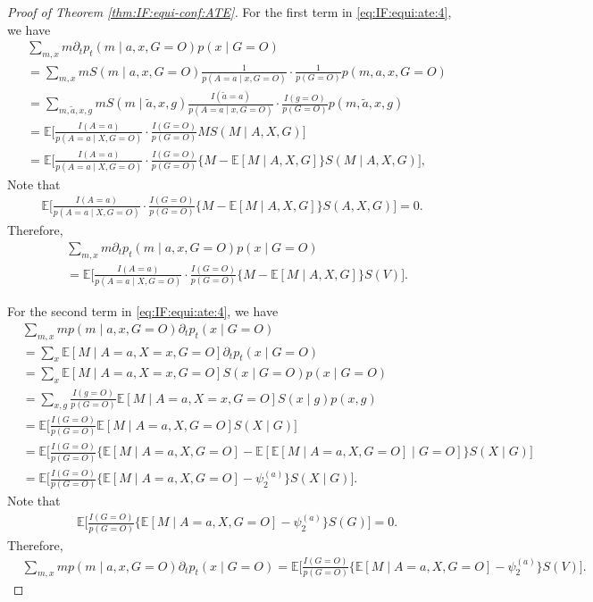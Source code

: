 \documentclass[10pt]{article}
\newcommand{\E}{\mathbb{E}}
\begin{document}
\begin{proof}[Proof of Theorem \ref{thm:IF:equi-conf:ATE}]
For the first term in \eqref{eq:IF:equi:ate:4}, we have
\begin{align*}
&\sum_{m,x} m\partial_t p_t(m\mid a,x,G=O)p(x\mid G=O)\\
&=\sum_{m,x} mS(m\mid a,x,G=O)\frac{1}{p(A=a\mid x,G=O)}\cdot\frac{1}{p(G=O)}p(m,a,x,G=O)\\
&=\sum_{m,\tilde{a},x,g} mS(m\mid \tilde{a},x,g)\frac{I(\tilde{a}=a)}{p(A=a\mid x,G=O)}\cdot\frac{I(g=O)}{p(G=O)}p(m,\tilde{a},x,g)\\
&=\E\Big[
\frac{I(A=a)}{p(A=a\mid X,G=O)}\cdot\frac{I(G=O)}{p(G=O)}
MS(M\mid A,X,G)
\Big]\\
&=\E\Big[
\frac{I(A=a)}{p(A=a\mid X,G=O)}\cdot\frac{I(G=O)}{p(G=O)}
\{M-\E[M\mid A,X,G]\}S(M\mid A,X,G)
\Big],
\end{align*}
Note that
\begin{align*}
\E\Big[
\frac{I(A=a)}{p(A=a\mid X,G=O)}\cdot\frac{I(G=O)}{p(G=O)}
\{M-\E[M\mid A,X,G]\}S(A,X,G)
\Big]=0.
\end{align*}
Therefore,
\begin{equation}
\label{eq:IF:equi:ate:5}
\begin{aligned}
&\sum_{m,x} m\partial_t p_t(m\mid a,x,G=O)p(x\mid G=O)\\
&=\E\Big[
\frac{I(A=a)}{p(A=a\mid X,G=O)}\cdot\frac{I(G=O)}{p(G=O)}
\{M-\E[M\mid A,X,G]\}S(V)
\Big].
\end{aligned}
\end{equation}

For the second term in \eqref{eq:IF:equi:ate:4}, we have
\begin{align*}
&\sum_{m,x} m p(m\mid a,x,G=O)\partial_t p_t(x\mid G=O)\\
&=\sum_{x} \E[M\mid A=a,X=x,G=O]\partial_t p_t(x\mid G=O)\\
&=\sum_{x} \E[M\mid A=a,X=x,G=O] S(x\mid G=O)p(x\mid G=O)\\
&=\sum_{x,g}\frac{I(g=O)}{p(G=O)}\E[M\mid A=a,X=x,G=O]S(x\mid g)p(x,g)\\
&=\E\Big[\frac{I(G=O)}{p(G=O)}\E[M\mid A=a,X,G=O]S(X\mid G)\Big]\\
&=\E\Big[\frac{I(G=O)}{p(G=O)}\{\E[M\mid A=a,X,G=O]-\E[\E[M\mid A=a,X,G=O]\mid G=O]\}S(X\mid G)\Big]\\
&=\E\Big[\frac{I(G=O)}{p(G=O)}\{\E[M\mid A=a,X,G=O]-\psi_2^{(a)}\}S(X\mid G)\Big].
\end{align*}
Note that
\begin{align*}
&\E\Big[\frac{I(G=O)}{p(G=O)}\{\E[M\mid A=a,X,G=O]-\psi_2^{(a)}\}S(G)\Big]=0.
\end{align*}
Therefore,
\begin{equation}
\label{eq:IF:equi:ate:6}
\begin{aligned}
&\sum_{m,x} m p(m\mid a,x,G=O)\partial_t p_t(x\mid G=O)
=\E\Big[\frac{I(G=O)}{p(G=O)}\{\E[M\mid A=a,X,G=O]-\psi_2^{(a)}\}S(V)\Big].
\end{aligned}
\end{equation}


\end{proof}
\end{document}

